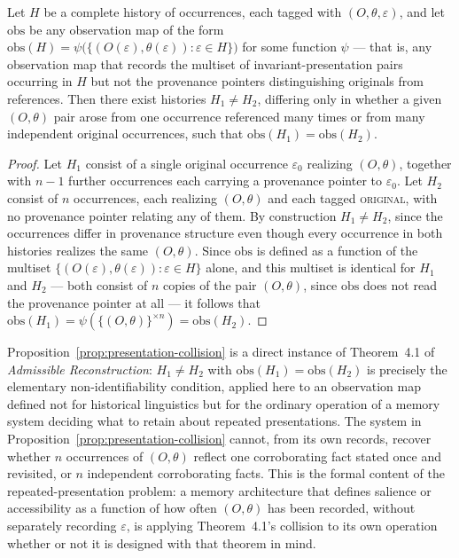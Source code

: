 \begin{proposition}
\label{prop:presentation-collision}
Let $H$ be a complete history of occurrences, each tagged with $(O, \theta, \varepsilon)$, and let $\mathrm{obs}$ be any observation map of the form $\mathrm{obs}(H) = \psi\bigl(\{(O(\varepsilon), \theta(\varepsilon)) : \varepsilon \in H\}\bigr)$ for some function $\psi$ --- that is, any observation map that records the multiset of invariant-presentation pairs occurring in $H$ but not the provenance pointers distinguishing originals from references. Then there exist histories $H_1 \neq H_2$, differing only in whether a given $(O,\theta)$ pair arose from one occurrence referenced many times or from many independent original occurrences, such that $\mathrm{obs}(H_1) = \mathrm{obs}(H_2)$.
\end{proposition}

\begin{proof}
Let $H_1$ consist of a single original occurrence $\varepsilon_0$ realizing $(O, \theta)$, together with $n - 1$ further occurrences each carrying a provenance pointer to $\varepsilon_0$. Let $H_2$ consist of $n$ occurrences, each realizing $(O, \theta)$ and each tagged \textsc{original}, with no provenance pointer relating any of them. By construction $H_1 \neq H_2$, since the occurrences differ in provenance structure even though every occurrence in both histories realizes the same $(O, \theta)$. Since $\mathrm{obs}$ is defined as a function of the multiset $\{(O(\varepsilon), \theta(\varepsilon)) : \varepsilon \in H\}$ alone, and this multiset is identical for $H_1$ and $H_2$ --- both consist of $n$ copies of the pair $(O, \theta)$, since $\mathrm{obs}$ does not read the provenance pointer at all --- it follows that $\mathrm{obs}(H_1) = \psi(\{(O,\theta)\}^{\times n}) = \mathrm{obs}(H_2)$.
\end{proof}

Proposition~\ref{prop:presentation-collision} is a direct instance of Theorem~4.1 of \emph{Admissible Reconstruction}: $H_1 \neq H_2$ with $\mathrm{obs}(H_1) = \mathrm{obs}(H_2)$ is precisely the elementary non-identifiability condition, applied here to an observation map defined not for historical linguistics but for the ordinary operation of a memory system deciding what to retain about repeated presentations. The system in Proposition~\ref{prop:presentation-collision} cannot, from its own records, recover whether $n$ occurrences of $(O,\theta)$ reflect one corroborating fact stated once and revisited, or $n$ independent corroborating facts. This is the formal content of the repeated-presentation problem: a memory architecture that defines salience or accessibility as a function of how often $(O,\theta)$ has been recorded, without separately recording $\varepsilon$, is applying Theorem~4.1's collision to its own operation whether or not it is designed with that theorem in mind.

